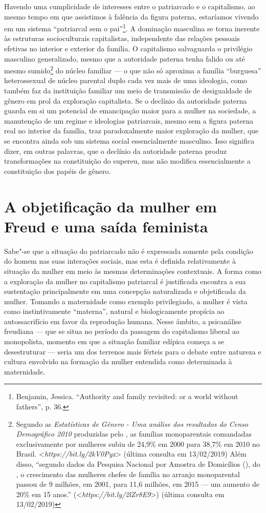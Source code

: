 Havendo uma cumplicidade de interesses entre o patriarcado e o
capitalismo, ao mesmo tempo em que assistimos à falência da figura
paterna, estaríamos vivendo em um sistema ``patriarcal sem o
pai''\footnote{Benjamin, Jessica. ``Authority and family revisited: or a
  world without fathers'', p. 36.}. A dominação masculina se torna
inerente às estruturas socioculturais capitalistas, independente das
relações pessoais efetivas no interior e exterior da família. O
capitalismo salvaguarda o privilégio masculino generalizado, mesmo que a
autoridade paterna tenha falido ou até mesmo sumido\footnote{Segundo as
  \emph{Estatísticas de Gênero - Uma análise dos resultados do Censo
  Demográfico 2010} produzidas pelo , as famílias monoparentais
  comandadas exclusivamente por mulheres subiu de 24,9\% em 2000 para
  38,7\% em 2010 no Brasil.
  \textless{}\emph{https://bit.ly/2kV0Pyx}\textgreater{}
  (última consulta em 13/02/2019) Além disso, ``segundo dados da
  Pesquisa Nacional por Amostra de Domicílios (), do , o
  crescimento das mulheres chefes de família no arranjo monoparental
  passou de 9 milhões, em 2001, para 11,6 milhões, em 2015 --- um aumento
  de 20\% em 15 anos.''
  (\textless{}\emph{https://bit.ly/2lZr8E9}\textgreater{})
  (última consulta em 13/02/2019)} do núcleo familiar --- o que não só
aproxima a família ``burguesa'' heterossexual de núcleo parental duplo
cada vez mais de uma ideologia, como também faz da instituição familiar
um meio de transmissão de desigualdade de gênero em prol da exploração
capitalista. Se o declínio da autoridade paterna guarda em si um
potencial de emancipação maior para a mulher na sociedade, a manutenção
de um regime e ideologias patriarcais, mesmo sem a figura paterna real
no interior da família, traz paradoxalmente maior exploração da mulher,
que se encontra ainda sob um sistema social essencialmente masculino.
Isso significa dizer, em outras palavras, que o declínio da autoridade
paterna produz transformações na constituição do supereu, mas não
modifica essencialmente a constituição dos papéis de gênero.

\section{A objetificação da mulher em Freud e uma saída feminista}

Sabe"-se que a situação do patriarcado não é expressada somente pela
condição do homem nas suas interações sociais, mas esta é definida
relativamente à situação da mulher em meio às mesmas determinações
contextuais. A forma como a exploração da mulher no capitalismo
patriarcal é justificada encontra a sua sustentação principalmente em
uma concepção naturalizada e objetificada da mulher. Tomando a
maternidade como exemplo privilegiado, a mulher é vista como
instintivamente ``materna'', natural e biologicamente propícia ao
autossacrifício em favor da reprodução humana. Nesse âmbito, a
psicanálise freudiana --- que se situa no período da passagem do
capitalismo liberal ao monopolista, momento em que a situação familiar
edípica começa a se desestruturar --- seria um dos terrenos mais férteis
para o debate entre natureza e cultura envolvido na formação da mulher
entendida como determinada à maternidade.

